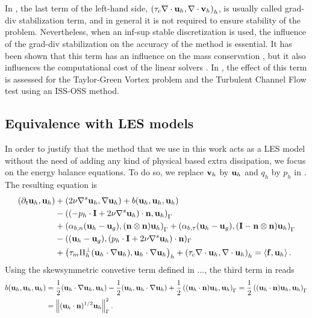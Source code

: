 In , the last term of the left-hand side, $ \left(\tau_c\nabla\cdot{\bf u}_h,\nabla\cdot{\bf v}_h\right)_h $, is usually called grad-div stabilization term, and in general it is not required to ensure stability of the problem. Nevertheless, when an inf-sup stable discretization is used, the influence of the grad-div stabilization on the accuracy of the method is essential. It has been shown that this term has an influence on the mass conservation \cite{linke_collision_2009}, but it also influences the computational cost of the linear solvers \cite{olshanskii_grad-div_2004,heister_efficient_2013}. In , the effect of this term is assessed for the Taylor-Green Vortex problem and the Turbulent Channel Flow test using an ISS-OSS method.

\subsection{Equivalence with LES models}
\label{subsec-C7_tbt_OSS_ISS}
In order to justify that the method that we use in this work acts as a LES model without the need of adding any kind of physical based extra dissipation, we focus on the energy balance equations. To do so, we replace $ {\bf v}_h $ by $ {\bf u}_h $ and $ q_h $ by $ p_h $ in . The resulting equation is
\begin{align}
\label{eq-C7_NS_ene_balance_1}
(\partial_t{\bf u}_h,{\bf u}_h)&+(2\nu\nabla^s{\bf u}_h,\nabla{\bf u}_h)+b({\bf u}_h,{\bf u}_h,{\bf u}_h)\\\nonumber
&-\left((-p_h\cdot\mathbf{I}+2\nu\nabla^s{\bf u}_h)\cdot{\bf n},{\bf u}_h\right)_\Gamma\\\nonumber&+\left(\alpha_{b,n}({\bf u}_h-{\bf u}_g),({\bf n}\otimes{\bf n}){\bf u}_h\right)_\Gamma+\left(\alpha_{b,\tau}({\bf u}_h-{\bf u}_g),(\mathbf{I}-{\bf n}\otimes{\bf n}){\bf u}_h\right)_\Gamma\\\nonumber
&-(({\bf u}_h-{\bf u}_g),(p_h\cdot\mathbf{I}+2\nu\nabla^s{\bf u}_h)\cdot{\bf n})_\Gamma\\\nonumber
&+\left(\tau_m\Pi_h^\perp({\bf u}_h\cdot\nabla{\bf u}_h),{\bf u}_h\cdot\nabla{\bf u}_h\right)_h+\left(\tau_c\nabla\cdot{\bf u}_h,\nabla\cdot{\bf u}_h\right)_h=\left\langle{\bf f},{\bf u}_h\right\rangle.
\end{align}
Using the skewsymmetric convetive term defined in ..., the third term in  reads
\begin{align*}
b({\bf u}_h,{\bf u}_h,{\bf u}_h)&=\frac{1}{2}({\bf u}_h\cdot\nabla{\bf u}_h,{\bf u}_h)-\frac{1}{2}({\bf u}_h,{\bf u}_h\cdot\nabla{\bf u}_h)+\frac{1}{2}\left(({\bf u}_h\cdot{\bf n}){\bf u}_h,{\bf u}_h\right)_\Gamma=\frac{1}{2}\left(({\bf u}_h\cdot{\bf n}){\bf u}_h,{\bf u}_h\right)_\Gamma\\
&=\left\|({\bf u}_h\cdot{\bf n})^{1/2}{\bf u}_h\right\|^2_\Gamma.
\end{align*}
